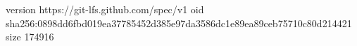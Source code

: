 version https://git-lfs.github.com/spec/v1
oid sha256:0898dd6fbd019ea37785452d385e97da3586dc1e89ea89ceb75710c80d214421
size 174916
